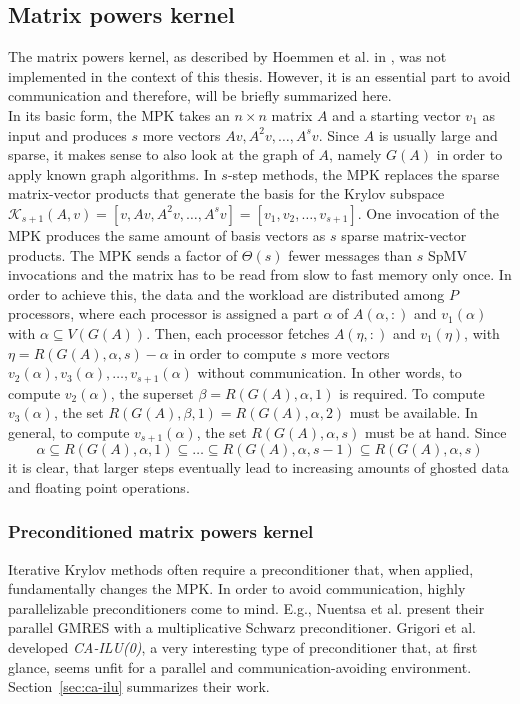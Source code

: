\documentclass{scrartcl}
\numberwithin{equation}{section}
\begin{document}
\subsection{Matrix powers kernel}
The matrix powers kernel, as described by Hoemmen et al. in \cite{Hoemmen:2010:CKS:1970638}, was not implemented in the context of this thesis. However, it is an essential part to avoid communication and therefore, will be briefly summarized here.\\
In its basic form, the MPK takes an $n \times n$ matrix $A$ and a starting vector $v_1$ as input and produces $s$ more vectors $Av, A^2v, \ldots, A^sv$. Since $A$ is usually large and sparse, it makes sense to also look at the graph of $A$, namely $G(A)$ in order to apply known graph algorithms. In $s$-step methods, the MPK replaces the sparse matrix-vector products that generate the basis for the Krylov subspace $\mathcal{K}_{s + 1}(A, v) = \left[v, Av, A^2v, \ldots, A^{s}v\right] = \left[v_1, v_2, \ldots, v_{s + 1}\right]$. One invocation of the MPK produces the same amount of basis vectors as $s$ sparse matrix-vector products. The MPK sends a factor of $\Theta(s)$ fewer messages than $s$ SpMV invocations and the matrix has to be read from slow to fast memory only once.
In order to achieve this, the data and the workload are distributed among $P$ processors, where each processor is assigned a part $\alpha$ of $A(\alpha,:)$ and $v_1(\alpha)$ with $\alpha \subseteq V(G(A))$. Then, each processor fetches $A(\eta,:)$ and $v_1(\eta)$, with $\eta = R(G(A), \alpha, s) - \alpha$ in order to compute $s$ more vectors $v_2(\alpha), v_3(\alpha), \ldots, v_{s + 1}(\alpha)$ without communication. In other words, to compute $v_2(\alpha)$, the superset $\beta = R(G(A),\alpha, 1)$ is required. To compute $v_3(\alpha)$, the set $R(G(A),\beta, 1) = R(G(A),\alpha, 2)$ must be available. In general, to compute $v_{s + 1}(\alpha)$, the set $R(G(A),\alpha, s)$ must be at hand. Since
\begin{equation*}
\alpha \subseteq R(G(A),\alpha, 1) \subseteq \ldots \subseteq R(G(A),\alpha, s - 1) \subseteq R(G(A),\alpha, s)
\end{equation*} it is clear, that larger steps eventually lead to increasing amounts of ghosted data and floating point operations.

\subsubsection{Preconditioned matrix powers kernel}
Iterative Krylov methods often require a preconditioner that, when applied, fundamentally changes the MPK. In order to avoid communication, highly parallelizable preconditioners come to mind. E.g., Nuentsa et al. \cite{nuen11c} present their parallel GMRES with a multiplicative Schwarz preconditioner. Grigori et al. \cite{Grigori} developed \textit{CA-ILU(0)}, a very interesting type of preconditioner that, at first glance, seems unfit for a parallel and communication-avoiding environment. Section~\ref{sec:ca-ilu} summarizes their work.
\end{document}
